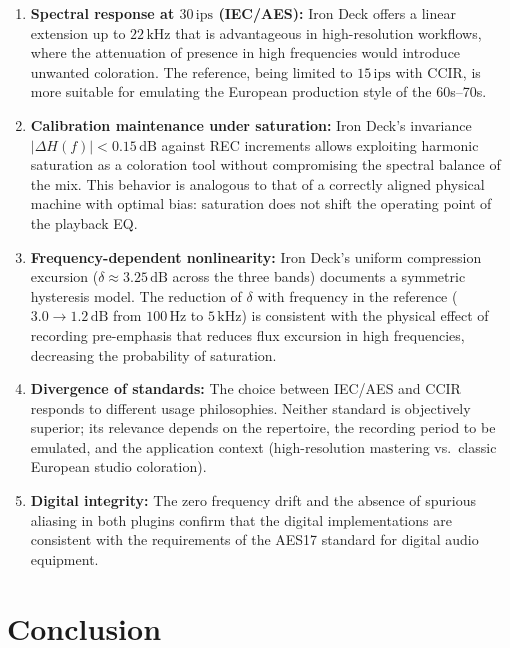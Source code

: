 \documentclass[10pt,conference]{IEEEtran}
\begin{document}
\begin{enumerate}
    \item \textbf{Spectral response at $30\,\text{ips}$ (IEC/AES):} Iron Deck offers a linear
    extension up to $22\,\text{kHz}$ that is advantageous in high-resolution workflows, where
    the attenuation of presence in high frequencies would introduce unwanted coloration.
    The reference, being limited to $15\,\text{ips}$ with CCIR, is more suitable for
    emulating the European production style of the 60s--70s.

    \item \textbf{Calibration maintenance under saturation:} Iron Deck's invariance $|\Delta H(f)|
    < 0.15\,\text{dB}$ against REC increments allows exploiting harmonic saturation as a coloration
    tool without compromising the spectral balance of the mix. This behavior is analogous to that of
    a correctly aligned physical machine with optimal bias: saturation does not shift the operating
    point of the playback EQ.

    \item \textbf{Frequency-dependent nonlinearity:} Iron Deck's uniform compression excursion
    ($\delta \approx 3.25\,\text{dB}$ across the three bands) documents a symmetric hysteresis model.
    The reduction of $\delta$ with frequency in the reference ($3.0 \to 1.2\,\text{dB}$ from
    $100\,\text{Hz}$ to $5\,\text{kHz}$) is consistent with the physical effect of recording pre-emphasis
    that reduces flux excursion in high frequencies, decreasing the probability of saturation.

    \item \textbf{Divergence of standards:} The choice between IEC/AES and CCIR responds to
    different usage philosophies. Neither standard is objectively superior; its relevance depends
    on the repertoire, the recording period to be emulated, and the application context
    (high-resolution mastering vs.\ classic European studio coloration).

    \item \textbf{Digital integrity:} The zero frequency drift and the absence of spurious aliasing
    in both plugins confirm that the digital implementations are consistent with the requirements of
    the AES17 standard \cite{aes17} for digital audio equipment.
\end{enumerate}

\section{Conclusion}
\end{document}
